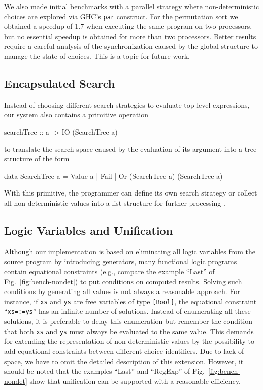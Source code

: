 \documentclass{llncs}
\newcommand{\code}[1]{\mbox{\small\texttt{#1}}}
\newcommand{\ccode}[1]{``\code{#1}''}
\begin{document}
We also made initial benchmarks with a parallel strategy
where non-deterministic choices are explored via GHC's \code{par}
construct. For the permutation sort we obtained a speedup of 1.7
when executing the same program on two processors, but no essential
speedup is obtained for more than two processors.
Better results require a careful analysis of the synchronization
caused by the global structure to manage the state of choices.
This is a topic for future work.

\subsection{Encapsulated Search}

Instead of choosing different search strategies to evaluate
top-level expressions, our system also contains a primitive operation
\begin{curry}
 searchTree :: a -> IO (SearchTree a)
\end{curry}
to translate the search space caused by the evaluation of its argument
into a tree structure of the form
\begin{curry}
 data SearchTree a = Value a | Fail | Or (SearchTree a) (SearchTree a)
\end{curry}
With this primitive,
the programmer can define its own search strategy or
collect all non-deterministic values into a list structure
for further processing \cite{BrasselHuch07}.


\subsection{Logic Variables and Unification}
\label{sec:unification}

Although our implementation is based on eliminating all logic
variables from the source program by introducing generators,
many functional logic programs contain equational constraints
(e.g., compare the example ``Last'' of Fig.~\ref{fig:bench-nondet})
to put conditions on computed results.
Solving such conditions by generating all values is not always
a reasonable approach. For instance, if \code{xs} and \code{ys}
are free variables of type \code{[Bool]}, the equational
constraint \ccode{xs=:=ys} has an infinite number of solutions.
Instead of enumerating all these solutions, it is preferable to
delay this enumeration but remember the condition that both
\code{xs} and \code{ys} must always be evaluated to the same value.
This demands for extending the representation of non-deterministic
values by the possibility to add equational constraints between
different choice identifiers.
Due to lack of space, we have to omit the detailed description
of this extension.
However, it should be noted that the examples
``Last'' and ``RegExp'' of Fig.~\ref{fig:bench-nondet}
show that unification can be supported with a reasonable efficiency.
\end{document}
